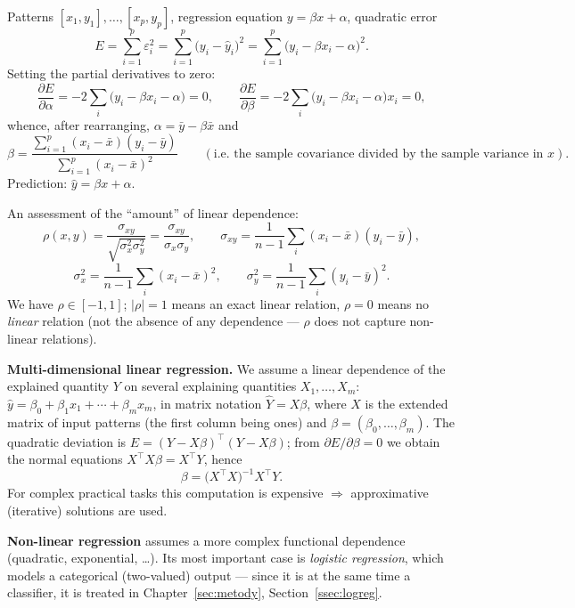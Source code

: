 \documentclass[11pt,a4paper]{article}
\theoremstyle{definition}
\providecommand{\uv}[1]{``#1''}
\begin{document}
\begin{defbox}
Patterns $[x_1,y_1],\dots,[x_p,y_p]$, regression equation $y=\beta x+\alpha$, quadratic error
\[ E=\sum_{i=1}^{p}\varepsilon_i^2=\sum_{i=1}^{p}\big(y_i-\hat y_i\big)^2
   =\sum_{i=1}^{p}\big(y_i-\beta x_i-\alpha\big)^2. \]
Setting the partial derivatives to zero:
\[ \frac{\partial E}{\partial\alpha}=-2\sum_i\big(y_i-\beta x_i-\alpha\big)=0,\qquad
   \frac{\partial E}{\partial\beta}=-2\sum_i\big(y_i-\beta x_i-\alpha\big)x_i=0, \]
whence, after rearranging, $\alpha=\bar y-\beta\bar x$ and
\[ \beta=\frac{\sum_{i=1}^{p}(x_i-\bar x)(y_i-\bar y)}{\sum_{i=1}^{p}(x_i-\bar x)^2}
   \qquad(\text{i.e.\ the sample covariance divided by the sample variance in }x). \]
Prediction: $\hat y=\beta x+\alpha$.
\end{defbox}

\begin{defbox}
An assessment of the \uv{amount} of linear dependence:
\[ \rho(x,y)=\frac{\sigma_{xy}}{\sqrt{\sigma_x^2\sigma_y^2}}=\frac{\sigma_{xy}}{\sigma_x\sigma_y},
\qquad
\sigma_{xy}=\frac{1}{n-1}\sum_i (x_i-\bar x)(y_i-\bar y), \]
\[ \sigma_x^2=\frac{1}{n-1}\sum_i (x_i-\bar x)^2,\qquad
   \sigma_y^2=\frac{1}{n-1}\sum_i (y_i-\bar y)^2. \]
We have $\rho\in[-1,1]$; $|\rho|=1$ means an exact linear relation, $\rho=0$ means no
\emph{linear} relation (not the absence of any dependence --- $\rho$ does not capture non-linear
relations).
\end{defbox}

\textbf{Multi-dimensional linear regression.} We assume a linear dependence of the explained
quantity $Y$ on several explaining quantities $X_1,\dots,X_m$:
$\hat y=\beta_0+\beta_1x_1+\cdots+\beta_mx_m$, in matrix notation $\hat Y=X\beta$, where $X$ is
the extended matrix of input patterns (the first column being ones) and
$\beta=(\beta_0,\dots,\beta_m)$. The quadratic deviation is
$E=(Y-X\beta)^{\!\top}(Y-X\beta)$; from $\partial E/\partial\beta=0$ we obtain the normal
equations $X^{\!\top}\!X\beta=X^{\!\top}Y$, hence
\[ \beta=\big(X^{\!\top}\!X\big)^{-1}X^{\!\top}Y. \]
For complex practical tasks this computation is expensive $\Rightarrow$ approximative
(iterative) solutions are used.

\textbf{Non-linear regression} assumes a more complex functional dependence (quadratic,
exponential, \dots). Its most important case is \emph{logistic regression}, which models a
categorical (two-valued) output --- since it is at the same time a classifier, it is treated in
Chapter~\ref{sec:metody}, Section~\ref{ssec:logreg}.
\end{document}
